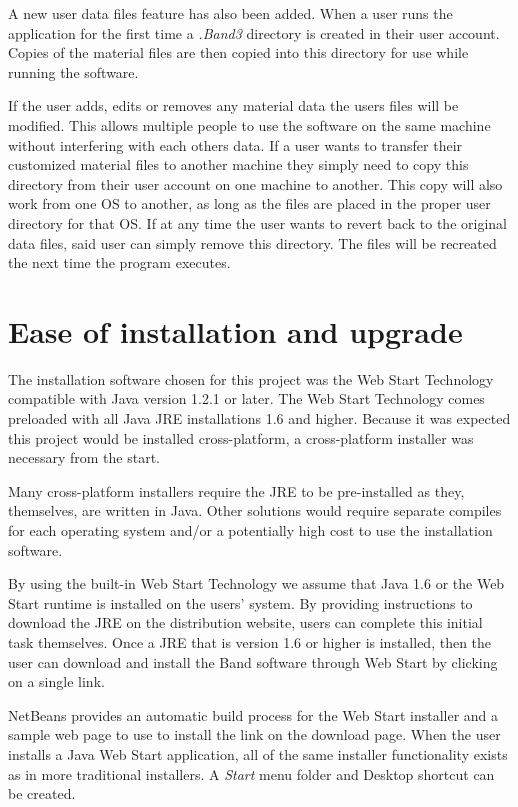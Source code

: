 \documentclass[project]{bsu-ms}
\begin{document}
A new user data files feature has also been added. When a user runs the application for the first time a \emph{.Band3} directory is created in their user account. Copies of the material files are then copied into this directory for use while running the software. 

If the user adds, edits or removes any material data the users files will be modified. This allows multiple people to use the software on the same machine without interfering with each others data. If a user wants to transfer their customized material files to another machine they simply need to copy this directory from their user account on one machine to another. This copy will also work from one OS to another, as long as the files are placed in the proper user directory for that OS. If at any time the user wants to revert back to the original data files, said user can simply remove this directory. The files will be recreated the next time the program executes.



\section{Ease of installation and upgrade}\label{sec:easeOfInstallation}
The installation software chosen for this project was the Web Start Technology compatible with Java version 1.2.1 or later. The Web Start Technology comes preloaded with all Java JRE installations 1.6 and higher. Because it was expected this project would be installed cross-platform, a cross-platform installer was necessary from the start. 

Many cross-platform installers require the JRE to be pre-installed as they, themselves, are written in Java. Other solutions would require separate compiles for each operating system and/or a potentially high cost to use the installation software. 

By using the built-in Web Start Technology we assume that Java 1.6 or the Web Start runtime is installed on the users' system. By providing instructions to download the JRE on the distribution website, users can complete this initial task themselves. Once a JRE that is version 1.6 or higher is installed, then the user can download and install the Band software through Web Start by clicking on a single link. 

NetBeans provides an automatic build process for the Web Start installer and a sample web page to use to install the link on the download page. When the user installs a Java Web Start application, all of the same installer functionality exists as in more traditional installers. A \emph{Start} menu folder and Desktop shortcut can be created.
\end{document}
